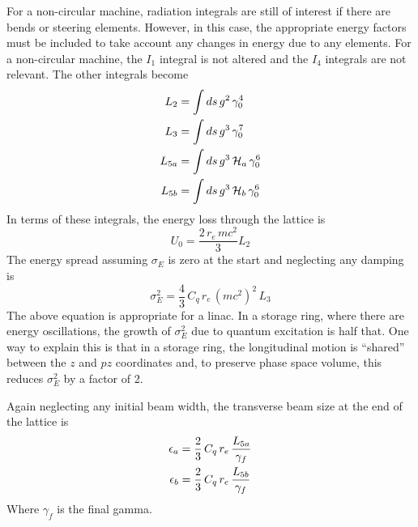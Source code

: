 For a non-circular machine, radiation integrals are still of interest
if there are bends or steering elements. However, in this case, the
appropriate energy factors must be included to take account any
changes in energy due to any  elements.  For a
non-circular machine, the $I_1$ integral is not altered and the $I_4$
integrals are not relevant. The other integrals become
  \begin{align}
    L_2 &= \int ds \, g^2 \, \gamma_0^4 \\
    L_3 &= \int ds \, g^3 \, \gamma_0^7 \\
    L_{5a} &= \int ds \, g^3 \, {\cal H}_a \, \gamma_0^6 \\
    L_{5b} &= \int ds \, g^3 \, {\cal H}_b \, \gamma_0^6
  \end{align}
In terms of these integrals, the energy loss through the lattice is
  \begin{equation}
    U_0 = \frac{2 \, r_e \, mc^2}{3} L_2
  \end{equation}
The energy spread assuming $\sigma_E$ is zero at the start and neglecting
any damping is
  \begin{equation}
    \sigma_E^2 = \frac{4}{3} \, C_q \, r_e \, \left( m c^2 \right)^2 \, L_3
  \end{equation}
The above equation is appropriate for a linac. In a storage ring, where
there are energy oscillations, the growth of $\sigma_E^2$ due to
quantum excitation is half that. One way to explain this is that in a
storage ring, the longitudinal motion is ``shared'' between the $z$ and
$pz$ coordinates and, to preserve phase space volume, this reduces
$\sigma_E^2$ by a factor of 2.

Again neglecting any initial beam width, the transverse beam size
at the end of the lattice is
  \begin{align}
    \epsilon_a &= \frac{2}{3} \, C_q \, r_e \, 
    \frac{L_{5a}}{\gamma_f} \nonumber \\
    \epsilon_b &= \frac{2}{3} \, C_q \, r_e \, 
    \frac{L_{5b}}{\gamma_f} 
  \end{align}
Where $\gamma_f$ is the final gamma.
